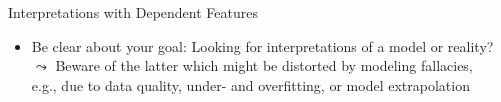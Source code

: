 \documentclass[11pt,compress,t,notes=noshow, aspectratio=169, xcolor=table]{beamer}
\begin{document}
\begin{frame}{Interpretations with Dependent Features}
\begin{itemize}

\pause

\item Be clear about your goal: Looking for interpretations of a model or reality?
\\
$\leadsto$ Beware of the latter which might be distorted by modeling fallacies, \\
e.g., due to data quality, under- and overfitting, or model extrapolation

\end{itemize}
\end{frame}



%


\end{document}

